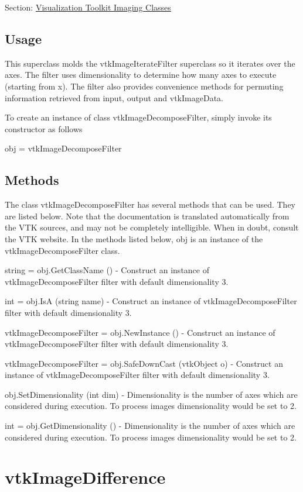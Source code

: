 Section\-: \hyperlink{sec_vtkimaging}{Visualization Toolkit Imaging Classes} \hypertarget{vtkwidgets_vtkxyplotwidget_Usage}{}\subsection{Usage}\label{vtkwidgets_vtkxyplotwidget_Usage}
This superclass molds the vtk\-Image\-Iterate\-Filter superclass so it iterates over the axes. The filter uses dimensionality to determine how many axes to execute (starting from x). The filter also provides convenience methods for permuting information retrieved from input, output and vtk\-Image\-Data.

To create an instance of class vtk\-Image\-Decompose\-Filter, simply invoke its constructor as follows \begin{DoxyVerb}  obj = vtkImageDecomposeFilter
\end{DoxyVerb}
 \hypertarget{vtkwidgets_vtkxyplotwidget_Methods}{}\subsection{Methods}\label{vtkwidgets_vtkxyplotwidget_Methods}
The class vtk\-Image\-Decompose\-Filter has several methods that can be used. They are listed below. Note that the documentation is translated automatically from the V\-T\-K sources, and may not be completely intelligible. When in doubt, consult the V\-T\-K website. In the methods listed below, {\ttfamily obj} is an instance of the vtk\-Image\-Decompose\-Filter class. 
\begin{DoxyItemize}
\item {\ttfamily string = obj.\-Get\-Class\-Name ()} -\/ Construct an instance of vtk\-Image\-Decompose\-Filter filter with default dimensionality 3.  
\item {\ttfamily int = obj.\-Is\-A (string name)} -\/ Construct an instance of vtk\-Image\-Decompose\-Filter filter with default dimensionality 3.  
\item {\ttfamily vtk\-Image\-Decompose\-Filter = obj.\-New\-Instance ()} -\/ Construct an instance of vtk\-Image\-Decompose\-Filter filter with default dimensionality 3.  
\item {\ttfamily vtk\-Image\-Decompose\-Filter = obj.\-Safe\-Down\-Cast (vtk\-Object o)} -\/ Construct an instance of vtk\-Image\-Decompose\-Filter filter with default dimensionality 3.  
\item {\ttfamily obj.\-Set\-Dimensionality (int dim)} -\/ Dimensionality is the number of axes which are considered during execution. To process images dimensionality would be set to 2.  
\item {\ttfamily int = obj.\-Get\-Dimensionality ()} -\/ Dimensionality is the number of axes which are considered during execution. To process images dimensionality would be set to 2.  
\end{DoxyItemize}\hypertarget{vtkimaging_vtkimagedifference}{}\section{vtk\-Image\-Difference}\label{vtkimaging_vtkimagedifference}
